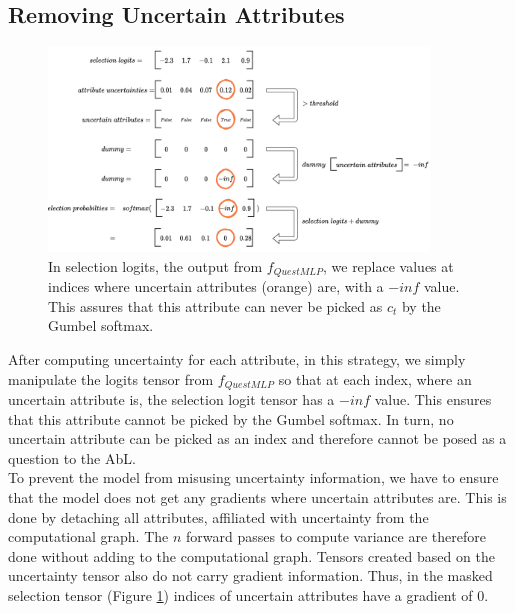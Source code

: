 \documentclass[a4paper,cleardoubleempty,BCOR1cm, 11pt]{report}
\begin{document}
\subsection{Removing Uncertain Attributes}\label{sec:remRDTC}
\begin{figure}
	\centering
	\includegraphics[width=0.9\textwidth]{images/remove_attrs.pdf} 
	\caption{In selection logits, the output from $f_{QuestMLP}$, we replace values at indices where uncertain attributes (orange) are, with a $-inf$ value. This assures that this attribute can never be picked as $c_t$ by the Gumbel softmax.}
	\label{fig:remove_intuition}
\end{figure}

After computing uncertainty for each attribute, in this strategy, we simply manipulate the logits tensor from $f_{QuestMLP}$ so that at each index, where an uncertain attribute is, the selection logit tensor has a $-inf$ value. This ensures that this attribute cannot be picked by the Gumbel softmax. In turn, no uncertain attribute can be picked as an index and therefore cannot be posed as a question to the AbL.\\
To prevent the model from misusing uncertainty information, we have to ensure that the model does not get any gradients where uncertain attributes are. This is done by detaching all attributes, affiliated with uncertainty from the computational graph. The $n$ forward passes to compute variance are therefore done without adding to the computational graph. Tensors created based on the uncertainty tensor also do not carry gradient information. Thus, in the masked selection tensor (Figure \ref{fig:remove_intuition}) indices of uncertain attributes have a gradient of $0$.
\end{document}
